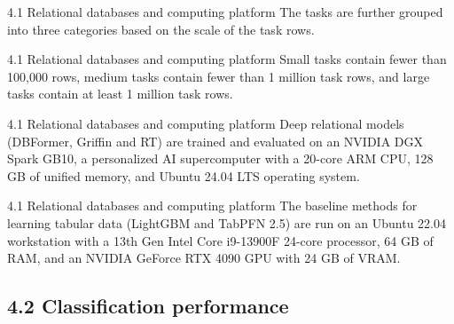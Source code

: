 \documentclass[aspectratio=169,10pt]{beamer}
\begin{document}
\begin{frame}{4.1 Relational databases and computing platform}
The tasks are further grouped into three categories based on the scale of the task rows.
\end{frame}

\begin{frame}{4.1 Relational databases and computing platform}
Small tasks contain fewer than 100,000 rows, medium tasks contain fewer than 1 million task rows, and large tasks contain at least 1 million task rows.
\end{frame}

\begin{frame}{4.1 Relational databases and computing platform}
Deep relational models (DBFormer, Griffin and RT) are trained and evaluated on an NVIDIA DGX Spark GB10, a personalized AI supercomputer with a 20-core ARM CPU, 128 GB of unified memory, and Ubuntu 24.04 LTS operating system.
\end{frame}

\begin{frame}{4.1 Relational databases and computing platform}
The baseline methods for learning tabular data (LightGBM and TabPFN 2.5) are run on an Ubuntu 22.04 workstation with a 13th Gen Intel Core i9-13900F 24-core processor, 64 GB of RAM, and an NVIDIA GeForce RTX 4090 GPU with 24 GB of VRAM.
\end{frame}

\subsection{4.2 Classification performance}
\end{document}
